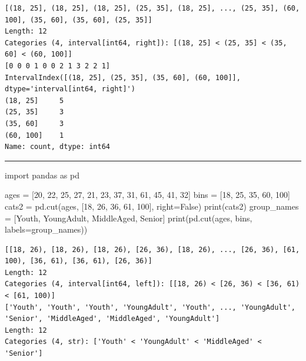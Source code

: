 \documentclass[
  polish,
  letterpaper,
  DIV=11,
  numbers=noendperiod]{scrreprt}
\newenvironment{Shaded}{\begin{snugshade}}{\end{snugshade}}
\newcommand{\BuiltInTok}[1]{\textcolor[rgb]{0.00,0.23,0.31}{#1}}
\newcommand{\DecValTok}[1]{\textcolor[rgb]{0.68,0.00,0.00}{#1}}
\newcommand{\ImportTok}[1]{\textcolor[rgb]{0.00,0.46,0.62}{#1}}
\newcommand{\NormalTok}[1]{\textcolor[rgb]{0.00,0.23,0.31}{#1}}
\newcommand{\OperatorTok}[1]{\textcolor[rgb]{0.37,0.37,0.37}{#1}}
\newcommand{\StringTok}[1]{\textcolor[rgb]{0.13,0.47,0.30}{#1}}
\newcommand{\VariableTok}[1]{\textcolor[rgb]{0.07,0.07,0.07}{#1}}
\begin{document}
\begin{verbatim}
[(18, 25], (18, 25], (18, 25], (25, 35], (18, 25], ..., (25, 35], (60, 100], (35, 60], (35, 60], (25, 35]]
Length: 12
Categories (4, interval[int64, right]): [(18, 25] < (25, 35] < (35, 60] < (60, 100]]
[0 0 0 1 0 0 2 1 3 2 2 1]
IntervalIndex([(18, 25], (25, 35], (35, 60], (60, 100]], dtype='interval[int64, right]')
(18, 25]     5
(25, 35]     3
(35, 60]     3
(60, 100]    1
Name: count, dtype: int64
\end{verbatim}

\begin{center}\rule{0.5\linewidth}{0.5pt}\end{center}

\begin{Shaded}
\begin{Highlighting}[]
\ImportTok{import}\NormalTok{ pandas }\ImportTok{as}\NormalTok{ pd}

\NormalTok{ages }\OperatorTok{=}\NormalTok{ [}\DecValTok{20}\NormalTok{, }\DecValTok{22}\NormalTok{, }\DecValTok{25}\NormalTok{, }\DecValTok{27}\NormalTok{, }\DecValTok{21}\NormalTok{, }\DecValTok{23}\NormalTok{, }\DecValTok{37}\NormalTok{, }\DecValTok{31}\NormalTok{, }\DecValTok{61}\NormalTok{, }\DecValTok{45}\NormalTok{, }\DecValTok{41}\NormalTok{, }\DecValTok{32}\NormalTok{]}
\NormalTok{bins }\OperatorTok{=}\NormalTok{ [}\DecValTok{18}\NormalTok{, }\DecValTok{25}\NormalTok{, }\DecValTok{35}\NormalTok{, }\DecValTok{60}\NormalTok{, }\DecValTok{100}\NormalTok{]}
\NormalTok{cats2 }\OperatorTok{=}\NormalTok{ pd.cut(ages, [}\DecValTok{18}\NormalTok{, }\DecValTok{26}\NormalTok{, }\DecValTok{36}\NormalTok{, }\DecValTok{61}\NormalTok{, }\DecValTok{100}\NormalTok{], right}\OperatorTok{=}\VariableTok{False}\NormalTok{)}
\BuiltInTok{print}\NormalTok{(cats2)}
\NormalTok{group\_names }\OperatorTok{=}\NormalTok{ [}\StringTok{\textquotesingle{}Youth\textquotesingle{}}\NormalTok{, }\StringTok{\textquotesingle{}YoungAdult\textquotesingle{}}\NormalTok{,}
               \StringTok{\textquotesingle{}MiddleAged\textquotesingle{}}\NormalTok{, }\StringTok{\textquotesingle{}Senior\textquotesingle{}}\NormalTok{]}
\BuiltInTok{print}\NormalTok{(pd.cut(ages, bins, labels}\OperatorTok{=}\NormalTok{group\_names))}
\end{Highlighting}
\end{Shaded}

\begin{verbatim}
[[18, 26), [18, 26), [18, 26), [26, 36), [18, 26), ..., [26, 36), [61, 100), [36, 61), [36, 61), [26, 36)]
Length: 12
Categories (4, interval[int64, left]): [[18, 26) < [26, 36) < [36, 61) < [61, 100)]
['Youth', 'Youth', 'Youth', 'YoungAdult', 'Youth', ..., 'YoungAdult', 'Senior', 'MiddleAged', 'MiddleAged', 'YoungAdult']
Length: 12
Categories (4, str): ['Youth' < 'YoungAdult' < 'MiddleAged' < 'Senior']
\end{verbatim}
\end{document}

